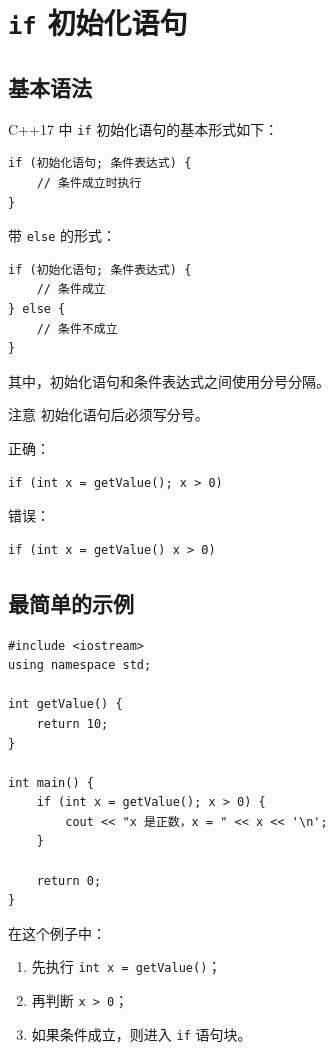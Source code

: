 \documentclass[UTF8,12pt,a4paper]{ctexart}
\begin{document}
\section{\texttt{if} 初始化语句}

\subsection{基本语法}

C++17 中 \texttt{if} 初始化语句的基本形式如下：

\begin{lstlisting}
if (初始化语句; 条件表达式) {
    // 条件成立时执行
}
\end{lstlisting}

带 \texttt{else} 的形式：

\begin{lstlisting}
if (初始化语句; 条件表达式) {
    // 条件成立
} else {
    // 条件不成立
}
\end{lstlisting}

其中，初始化语句和条件表达式之间使用分号分隔。

\begin{warningbox}{注意}
初始化语句后必须写分号。

正确：

\begin{lstlisting}
if (int x = getValue(); x > 0)
\end{lstlisting}

错误：

\begin{lstlisting}
if (int x = getValue() x > 0)
\end{lstlisting}
\end{warningbox}

\subsection{最简单的示例}

\begin{lstlisting}
#include <iostream>
using namespace std;

int getValue() {
    return 10;
}

int main() {
    if (int x = getValue(); x > 0) {
        cout << "x 是正数，x = " << x << '\n';
    }

    return 0;
}
\end{lstlisting}

在这个例子中：

\begin{enumerate}[label=\arabic*.]
    \item 先执行 \texttt{int x = getValue()}；
    \item 再判断 \texttt{x > 0}；
    \item 如果条件成立，则进入 \texttt{if} 语句块。
\end{enumerate}
\end{document}
